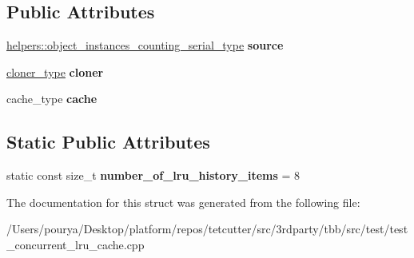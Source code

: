\subsection*{Public Attributes}
\begin{DoxyCompactItemize}
\item 
\hypertarget{structserial__tests_1_1usability_1_1instance__counting__fixture_a4ccadb2c9ba8e38a5f6a037ddbf66ef3}{}\hyperlink{structhelpers_1_1object__instances__counting__type}{helpers\+::object\+\_\+instances\+\_\+counting\+\_\+serial\+\_\+type} {\bfseries source}\label{structserial__tests_1_1usability_1_1instance__counting__fixture_a4ccadb2c9ba8e38a5f6a037ddbf66ef3}

\item 
\hypertarget{structserial__tests_1_1usability_1_1instance__counting__fixture_a7975d47684e41dcad6610804c6a2f310}{}\hyperlink{structserial__tests_1_1usability_1_1helpers_1_1clonning__function}{cloner\+\_\+type} {\bfseries cloner}\label{structserial__tests_1_1usability_1_1instance__counting__fixture_a7975d47684e41dcad6610804c6a2f310}

\item 
\hypertarget{structserial__tests_1_1usability_1_1instance__counting__fixture_a55f60a51ff4b890cdf03894f897f71eb}{}cache\+\_\+type {\bfseries cache}\label{structserial__tests_1_1usability_1_1instance__counting__fixture_a55f60a51ff4b890cdf03894f897f71eb}

\end{DoxyCompactItemize}
\subsection*{Static Public Attributes}
\begin{DoxyCompactItemize}
\item 
\hypertarget{structserial__tests_1_1usability_1_1instance__counting__fixture_aa0934cee13d32b6764e045d96f906777}{}static const size\+\_\+t {\bfseries number\+\_\+of\+\_\+lru\+\_\+history\+\_\+items} = 8\label{structserial__tests_1_1usability_1_1instance__counting__fixture_aa0934cee13d32b6764e045d96f906777}

\end{DoxyCompactItemize}


The documentation for this struct was generated from the following file\+:\begin{DoxyCompactItemize}
\item 
/\+Users/pourya/\+Desktop/platform/repos/tetcutter/src/3rdparty/tbb/src/test/test\+\_\+concurrent\+\_\+lru\+\_\+cache.\+cpp\end{DoxyCompactItemize}
